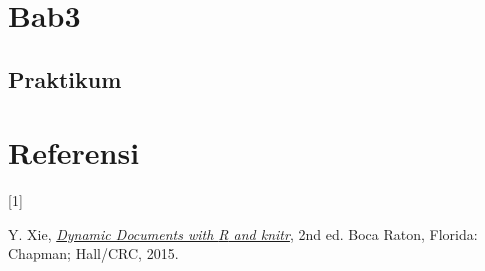\documentclass[
  indonesian,
  letterpaper,
]{book}
\newlength{\cslhangindent}
\newlength{\csllabelwidth}
\newenvironment{CSLReferences}[2] %
 {\begin{list}{}{%
  \setlength{\itemindent}{0pt}
  \setlength{\leftmargin}{0pt}
  \setlength{\parsep}{0pt}
  \ifodd #1
   \setlength{\leftmargin}{\cslhangindent}
   \setlength{\itemindent}{-1\cslhangindent}
  \fi
  \setlength{\itemsep}{#2\baselineskip}}}
 {\end{list}}
\newcommand{\CSLLeftMargin}[1]{\parbox[t]{\csllabelwidth}{\strut#1\strut}}
\newcommand{\CSLRightInline}[1]{\parbox[t]{\linewidth - \csllabelwidth}{\strut#1\strut}}
\begin{document}

\chapter{Bab3}\label{bab3}

\section{Praktikum}\label{praktikum}


\chapter*{Referensi}\label{referensi}


\protect{}\label{refs}
\begin{CSLReferences}{0}{0}
\CSLLeftMargin{{[}1{]} }%
\CSLRightInline{Y. Xie, \emph{\href{http://yihui.name/knitr/}{Dynamic
Documents with {R} and knitr}}, 2nd ed. Boca Raton, Florida: Chapman;
Hall/CRC, 2015.}

\end{CSLReferences}


\backmatter
\end{document}
